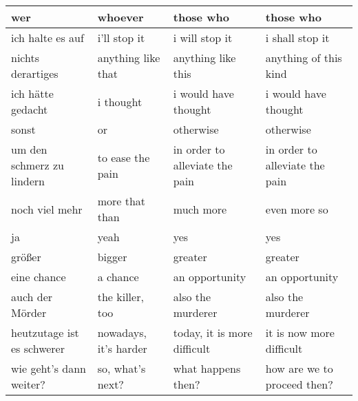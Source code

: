 \documentclass[11pt,a4paper]{article}
\begin{document}
\begin{table*}[]
\begin{tabular}{|p{3.5cm}|p{3.5cm}|p{3.5cm}|p{3.5cm}|}
wer                                     & whoever                           & those who                                   & those who                             \\ \hline
ich halte es auf                        & i'll stop it                      & i will stop it                              & i shall stop it                       \\ \hline
nichts derartiges                       & anything like that                & anything like this                          & anything of this kind                 \\ \hline
ich h{\"a}tte gedacht                       & i thought                         & i would have thought                        & i would have thought                  \\ \hline
sonst                                   & or                                & otherwise                                   & otherwise                             \\ \hline
um den schmerz zu lindern               & to ease the pain                  & in order to alleviate the pain              & in order to alleviate the pain        \\ \hline
noch viel mehr                          & more that than                    & much more                                   & even more so                          \\ \hline
ja                                      & yeah                              & yes                                         & yes                                   \\ \hline
gr{\"o}{\ss}er                                  & bigger                            & greater                                     & greater                               \\ \hline
eine chance                             & a chance                          & an opportunity                              & an opportunity                        \\ \hline
auch der M{\"o}rder                         & the killer, too                   & also the murderer                           & also the murderer                     \\ \hline
heutzutage ist es schwerer              & nowadays, it's harder             & today, it is more difficult                 & it is now more difficult              \\ \hline
wie geht's dann weiter?                 & so, what's next?                  & what happens then?                          & how are we to proceed then?           \\ \hline

\end{tabular}
\end{table*}
\end{document}
